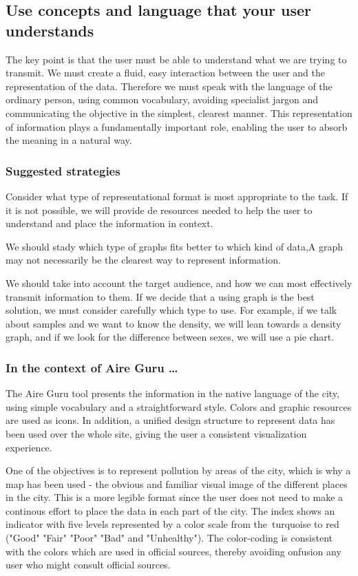 \subsection{Use concepts and language that your user understands}
The key point is that the user must be able to understand what we are trying to transmit. We must create a fluid, 
easy interaction between the user and the representation of the data. Therefore we must speak with the language of 
the ordinary person, using common vocabulary, avoiding specialist jargon and communicating the objective in the simplest, 
clearest manner. This representation of information plays a fundamentally important role, enabling the user to absorb 
the meaning in a natural way.

\subsubsection*{Suggested strategies} 
Consider what type of representational format is most appropriate to the task. If it is not possible, we will provide de 
resources needed to help the user to understand and place the information in context. 

We should stady which type of graphs fits better to which kind of data,A graph may not necessarily be the 
clearest way to represent information.

We should take into account the target audience, and how we can most effectively transmit information to them. 
If we decide that a using graph is the best solution, we must consider carefully which type to use. For example, 
if we talk about samples and we want to know the density, we will lean towards a density graph, and if we look for the difference
between sexes, we will use a pie chart.

\subsubsection*{In the context of Aire Guru \ldots} 
The Aire Guru tool presents the information in the native language of the city, using simple vocabulary and a 
straightforward style.
Colors and graphic resources are used as icons. In addition, a unified design structure to represent data has 
been used over the whole site, giving the user a consistent visualization experience. 

One of the objectives is to represent pollution by areas of the city, which is why a map has been used - the 
obvious and familiar visual image of the different places in the city. This is a more legible format since the user
does not need to make a continous effort to place the data in each part of the city. The index shows an indicator with 
five levels represented by a color scale from the turquoise to red ("Good" "Fair" "Poor" "Bad" and "Unhealthy"). 
The color-coding is consistent with the colors which are used in official sources, thereby avoiding onfusion any 
user who might consult official sources.

